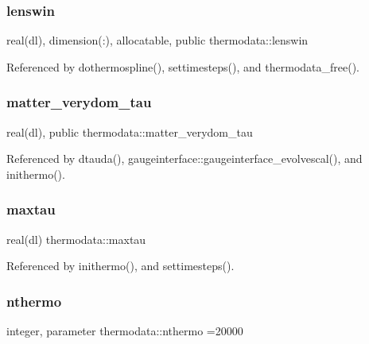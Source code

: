 \mbox{\label{namespacethermodata_a60473ac86869f6f9da92e4b0f76c5b12}} 
\subsubsection{\texorpdfstring{lenswin}{lenswin}}
{\footnotesize\ttfamily real(dl), dimension(\+:), allocatable, public thermodata\+::lenswin}



Referenced by dothermospline(), settimesteps(), and thermodata\+\_\+free().

\mbox{\label{namespacethermodata_a13e012a8b804a7e2796df4f1afc4118e}} 
\subsubsection{\texorpdfstring{matter\+\_\+verydom\+\_\+tau}{matter\_verydom\_tau}}
{\footnotesize\ttfamily real(dl), public thermodata\+::matter\+\_\+verydom\+\_\+tau}



Referenced by dtauda(), gaugeinterface\+::gaugeinterface\+\_\+evolvescal(), and inithermo().

\mbox{\label{namespacethermodata_a41426412f674a69c99b7756938fc4204}} 
\subsubsection{\texorpdfstring{maxtau}{maxtau}}
{\footnotesize\ttfamily real(dl) thermodata\+::maxtau\hspace{0.3cm}{\ttfamily [private]}}



Referenced by inithermo(), and settimesteps().

\mbox{\label{namespacethermodata_ab5a6325bede2b0cce4e867e9e1e18215}} 
\subsubsection{\texorpdfstring{nthermo}{nthermo}}
{\footnotesize\ttfamily integer, parameter thermodata\+::nthermo =20000\hspace{0.3cm}{\ttfamily [private]}}



